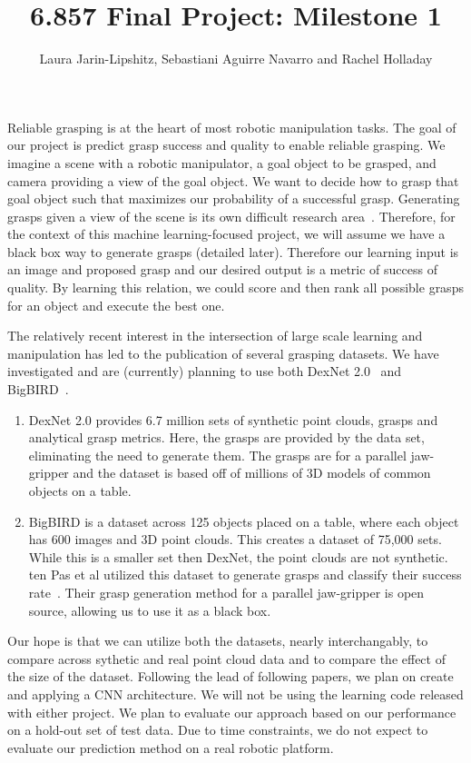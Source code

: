 \documentclass[letterpaper, 10 pt]{article}
\begin{document}
\title{6.857 Final Project: Milestone 1}
\author{Laura Jarin-Lipshitz, Sebastiani Aguirre Navarro and Rachel Holladay}
\maketitle

Reliable grasping is at the heart of most robotic manipulation tasks. 
The goal of our project is predict grasp success and quality to enable reliable grasping. 
We imagine a scene with a robotic manipulator, a goal object to be grasped, and camera providing a view of the goal object.
We want to decide how to grasp that goal object such that maximizes our probability of a successful grasp.
Generating grasps given a view of the scene is its own difficult research area~\cite{pinto2016supersizing,lenz2015deep,jiang2011efficient}.
Therefore, for the context of this machine learning-focused project, we will assume we have a black box way to generate grasps (detailed later). 
Therefore our learning input is an image and proposed grasp and our desired output is a metric of success of quality. 
By learning this relation, we could score and then rank all possible grasps for an object and execute the best one. 

The relatively recent interest in the intersection of large scale learning and manipulation has led to the publication of several grasping datasets. 
We have investigated and are (currently) planning to use both DexNet 2.0~\cite{mahler2017dex} and BigBIRD~\cite{singh2014bigbird}. 
\begin{enumerate}
   \item DexNet 2.0 provides 6.7 million sets of synthetic point clouds, grasps and analytical grasp metrics. Here, the grasps are provided by the data set, eliminating the need to generate them. The grasps are for a parallel jaw-gripper and the dataset is based off of millions of 3D models of common objects on a table.  
   \item BigBIRD is a dataset across 125 objects placed on a table, where each object has 600 images and 3D point clouds. This creates a dataset of 75,000 sets. While this is a smaller set then DexNet, the point clouds are not synthetic. ten Pas et al utilized this dataset to generate grasps and classify their success rate~\cite{pas2017grasp}. Their grasp generation method for a parallel jaw-gripper is open source, allowing us to use it as a black box. 
\end{enumerate}

Our hope is that we can utilize both the datasets, nearly interchangably, to compare across sythetic and real point cloud data and to compare the effect of the size of the dataset. 
Following the lead of following papers, we plan on create and applying a CNN architecture. 
We will not be using the learning code released with either project. 
We plan to evaluate our approach based on our performance on a hold-out set of test data. 
Due to time constraints, we do not expect to evaluate our prediction method on a real robotic platform. 




{\footnotesize
    
}
\end{document}
